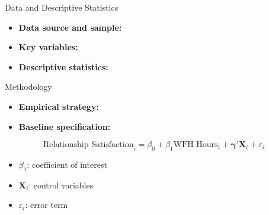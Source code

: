 \documentclass[aspectratio=169,11pt]{beamer}
\begin{document}

\begin{frame}{Data and Descriptive Statistics}

    \begin{itemize}
        \item \textbf{Data source and sample:}

        \item \textbf{Key variables:}

        \item \textbf{Descriptive statistics:}
    \end{itemize}

    \vspace{0.3cm}


\end{frame}


\begin{frame}{Methodology}

    \begin{itemize}
        \item \textbf{Empirical strategy:}

        \item \textbf{Baseline specification:}
    \end{itemize}

    \begin{equation*}
        \text{Relationship Satisfaction}_i
        =
        \beta_0
        + \beta_1 \text{WFH Hours}_i
        + \boldsymbol{\gamma}'\mathbf{X}_i
        + \varepsilon_i
    \end{equation*}

    \begin{itemize}
        \item $\beta_1$: coefficient of interest
        \item $\mathbf{X}_i$: control variables
        \item $\varepsilon_i$: error term
    \end{itemize}


\end{frame}
\end{document}

